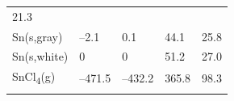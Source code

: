 \documentclass[
  9pt,
]{extbook}
\theoremstyle{definition}
\theoremstyle{definition}
\theoremstyle{definition}
\theoremstyle{remark}
\begin{document}
\begin{longtable}[]{@{}lllll@{}}
\begin{minipage}[t]{0.18\columnwidth}
21.3\strut
\end{minipage}\tabularnewline
\begin{minipage}[t]{0.10\columnwidth}\raggedright
Sn(s,gray)\strut
\end{minipage} & \begin{minipage}[t]{0.19\columnwidth}\raggedright
--2.1\strut
\end{minipage} & \begin{minipage}[t]{0.20\columnwidth}\raggedright
0.1\strut
\end{minipage} & \begin{minipage}[t]{0.18\columnwidth}\raggedright
44.1\strut
\end{minipage} & \begin{minipage}[t]{0.18\columnwidth}\raggedright
25.8\strut
\end{minipage}\tabularnewline
\begin{minipage}[t]{0.10\columnwidth}\raggedright
Sn(s,white)\strut
\end{minipage} & \begin{minipage}[t]{0.19\columnwidth}\raggedright
0\strut
\end{minipage} & \begin{minipage}[t]{0.20\columnwidth}\raggedright
0\strut
\end{minipage} & \begin{minipage}[t]{0.18\columnwidth}\raggedright
51.2\strut
\end{minipage} & \begin{minipage}[t]{0.18\columnwidth}\raggedright
27.0\strut
\end{minipage}\tabularnewline
\begin{minipage}[t]{0.10\columnwidth}\raggedright
SnCl\textsubscript{4}(g)\strut
\end{minipage} & \begin{minipage}[t]{0.19\columnwidth}\raggedright
--471.5\strut
\end{minipage} & \begin{minipage}[t]{0.20\columnwidth}\raggedright
--432.2\strut
\end{minipage} & \begin{minipage}[t]{0.18\columnwidth}\raggedright
365.8\strut
\end{minipage} & \begin{minipage}[t]{0.18\columnwidth}\raggedright
98.3\strut
\end{minipage}\tabularnewline
\begin{minipage}[t]{0.10\columnwidth}\raggedright

\end{minipage}
\end{longtable}
\end{document}
